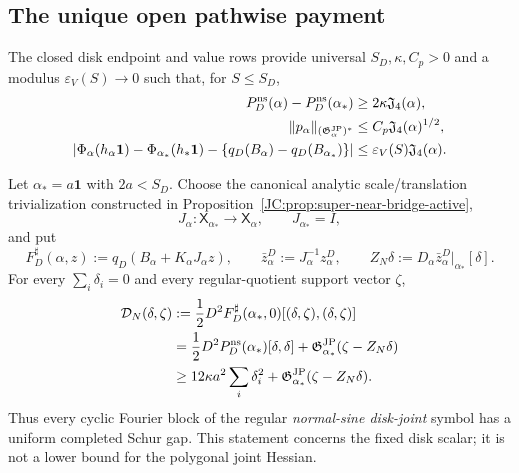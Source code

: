 \subsection{The unique open pathwise payment}

The closed disk endpoint and value rows provide universal
$S_D,\kappa,C_p>0$ and a modulus $\varepsilon_V(S)\to0$ such that, for
$S\le S_D$,
\begin{align}
 P_D^{\rm ns}(\alpha)-P_D^{\rm ns}(\alpha_*)
 &\ge2\kappa\mathfrak J_4(\alpha),\label{JC:eq:D0}\\
 \|p_\alpha\|_{(\mathfrak G^{\rm JP}_\alpha)^*}
 &\le C_p\mathfrak J_4(\alpha)^{1/2},\label{JC:eq:P}\\
 \left|\Phi_\alpha(h_\alpha\mathbf1)
 -\Phi_{\alpha_*}(h_*\mathbf1)
 -\{q_D(B_\alpha)-q_D(B_{\alpha_*})\}\right|
 &\le\varepsilon_V(S)\mathfrak J_4(\alpha).
 \label{JC:eq:V}
\end{align}

\begin{proposition}
\label{JC:prop:regular-disk-joint}
Let $\alpha_*=a\mathbf1$ with $2a<S_D$.  Choose the canonical analytic
scale/translation trivialization constructed in
Proposition~\ref{JC:prop:super-near-bridge-active},
\[
 J_\alpha:\mathsf X_{\alpha_*}\longrightarrow\mathsf X_\alpha,
 \qquad J_{\alpha_*}=I,
\]
and put
\[
 F_D^\sharp(\alpha,z):=
 q_D(B_\alpha+K_\alpha J_\alpha z),\qquad
 \bar z_\alpha^D:=J_\alpha^{-1}z_\alpha^D,\qquad
 Z_N\delta:=
 D_\alpha\bar z_\alpha^D\big|_{\alpha_*}[\delta].
\]
For every $\sum_i\delta_i=0$ and every regular-quotient support vector
$\zeta$,
\begin{align}
 \mathcal D_N(\delta,\zeta)
 &:=
 \frac12D^2F_D^\sharp(\alpha_*,0)
 [(\delta,\zeta),(\delta,\zeta)]
 \label{JC:eq:regular-disk-joint-identity}\\
 &=
 \frac12D^2P_D^{\rm ns}(\alpha_*)[\delta,\delta]
 +\mathfrak G^{\rm JP}_{\alpha_*}(\zeta-Z_N\delta)
 \notag\\
 &\ge
 12\kappa a^2\sum_i\delta_i^2
 +\mathfrak G^{\rm JP}_{\alpha_*}(\zeta-Z_N\delta).
 \label{JC:eq:regular-disk-joint-gap}
\end{align}
Thus every cyclic Fourier block of the regular
\emph{normal-sine disk-joint} symbol has a uniform completed Schur gap.
This statement concerns the fixed disk scalar; it is not a lower bound
for the polygonal joint Hessian.
\end{proposition}

